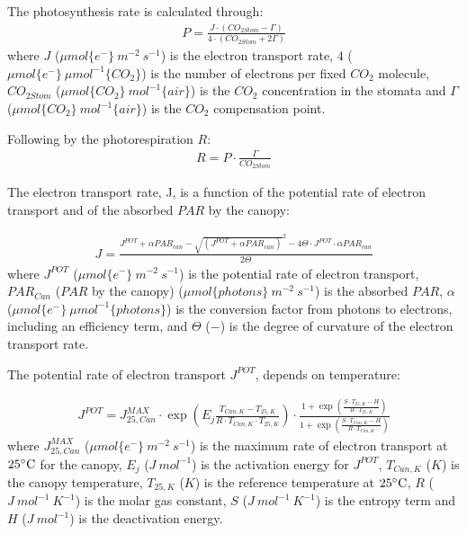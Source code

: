 \documentclass[a4paper]{article}
\numberwithin{equation}{section}
\begin{document}
The photosynthesis rate is calculated through:
\begin{align}
  P = \frac{J \cdot (CO_{2Stom} - \Gamma)}{4 \cdot (CO_{2Stom} + 2\Gamma)}
\end{align}
where \(J\) (\(\mu mol\{e^-\}\ m^{-2}\ s^{-1}\)) is the electron transport rate, \(4\) (\(\mu mol \{e^-\}\ \mu mol^{-1} \{CO_2\}\)) is the number of electrons per fixed \(CO_2\) molecule, \(CO_{2Stom}\) (\(\mu mol\{CO_2\}\ mol^{-1}\{air\}\)) is the \(CO_2\) concentration in the stomata and \(\Gamma\) (\(\mu mol \{CO_2\}\ mol^{-1} \{air\}\)) is the \(CO_2\) compensation point.

Following by the photorespiration \(R\):
\begin{align}
  R = P \cdot \frac{\Gamma}{CO_{2Stom}}
\end{align}

The electron transport rate, J, is a function of the potential rate of electron transport and of the absorbed \(PAR\) by the canopy:

\begin{align}
  J = \frac{J^{POT} + \alpha PAR_{can} - {\sqrt{(J^{POT} + \alpha PAR_{can})}^2 - 4\Theta\cdot J^{POT}\cdot \alpha PAR_{can}}}{2 \Theta}
\end{align}
where \(J^{POT}\) (\(\mu mol\{e^-\}\ m^{-2}\ s^{-1}\)) is the potential rate of electron transport, \(PAR_{Can}\) (\(PAR\) by the canopy) (\(\mu mol\{photons\}\ m^{-2}\ s^{-1}\)) is the absorbed \(PAR\), \(\alpha\) (\(\mu mol\{e^-\}\ \mu mol^{-1}\{photons\}\)) is the conversion factor from photons to electrons, including an efficiency term, and \(\Theta\) (\(-\)) is the degree of curvature of the electron transport rate.

The potential rate of electron transport \(J^{POT}\), depends on temperature:

\begin{align}
  J^{POT} = J^{MAX}_{25,Can} \cdot \exp \left(E_j\frac{T_{Can,K}-T_{25,K}}{R\cdot T_{Can,K}\cdot T_{25,K}}\right) \cdot \frac{1 + \exp \left(\frac{S\cdot T_{25,K}-H}{R\cdot T_{25,K}}\right)}{1 + \exp \left(\frac{S\cdot T_{Can,K}-H}{R\cdot T_{Can,K}}\right)}
\end{align}
where \(J^{MAX}_{25,Can}\) (\(\mu mol \{e^-\}\ m^{-2}\ s^{-1}\)) is the maximum rate of electron transport at \(25 \celsius\) for the canopy, \(E_j\) (\(J\ mol^{-1}\)) is the activation energy for \(J^{POT}\), \(T_{Can,K}\) (\(K\)) is the canopy temperature, \(T_{25,K}\) (\(K\)) is the reference temperature at \(25 \celsius\), \(R\) (\(J\ mol^{-1}\ K^{-1}\)) is the molar gas constant, \(S\) (\(J\ mol^{-1}\ K^{-1}\)) is the entropy term and \(H\) (\(J\ mol^{-1}\)) is the deactivation energy.
\end{document}
